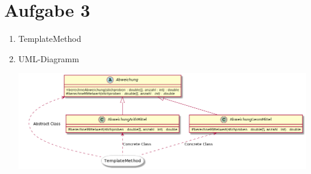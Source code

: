 \documentclass{article}
\begin{document}
	\section*{Aufgabe 3}
	\begin{enumerate}[label=(\alph*)]
		\item TemplateMethod
		\item UML-Diagramm
		\begin{center}
			\includegraphics[width=1\textwidth]{./Aufgabe7_3}
		\end{center}
	\end{enumerate}
	
\end{document}
